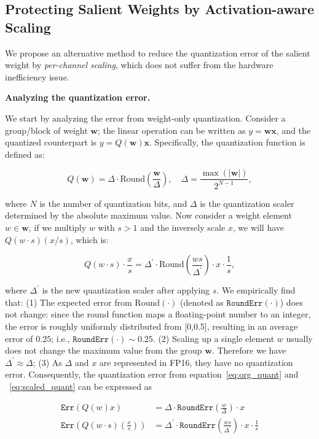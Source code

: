 \subsection{Protecting Salient Weights by Activation-aware Scaling} We propose an alternative method to reduce the quantization error of the salient weight by \emph{per-channel scaling}, which does not suffer from the hardware inefficiency issue. 

\textbf{Analyzing the quantization error.}

We start by analyzing the error from weight-only quantization. Consider a group/block of weight $\mathbf{w}$; the linear operation can be written as $y=\mathbf{w}\mathbf{x}$, and the quantized counterpart is $y=Q(\mathbf{w})\mathbf{x}$. Specifically, the quantization function is defined as:

\begin{equation}
    Q(\mathbf{w}) = \Delta \cdot \text{Round}(\frac{\mathbf{w}}{\Delta}), \quad \Delta = \frac{\max(|\mathbf{w}|)}{2^{N-1}},
    \label{eq:org_quant}
\end{equation}

where $N$ is the number of quantization bits, and $\Delta$ is the quantization scaler determined by the absolute maximum value. Now consider a weight element $w\in \mathbf{w}$, if we multiply $w$ with $s> 1$ and the inversely scale $x$, we will have $Q(w\cdot s)(x/s)$, which is:

\begin{equation}
    Q(w\cdot s)\cdot \frac{x}{s} = \Delta^{'} \cdot \text{Round}(\frac{ws}{\Delta^{'}}) \cdot x \cdot \frac{1}{s},
    \label{eq:scaled_quant}
\end{equation}

where $\Delta^{'}$ is the new quantization scaler after applying $s$. We empirically find that: (1) The expected error from $\text{Round}(\cdot)$ (denoted as $\texttt{RoundErr}(\cdot)$) does not change: since the round function maps a floating-point number to an integer, the error is roughly uniformly distributed from [0,0.5], resulting in an average error of $0.25$; i.e., $\texttt{RoundErr}(\cdot)\sim 0.25$. (2) Scaling up a single element $w$ usually does not change the maximum value from the group $\mathbf{w}$. Therefore we have $\Delta^{'}\approx\Delta$;
(3) As $\Delta$ and $x$ are represented in FP16, they have no quantization error. Consequently, the quantization error from equation~\ref{eq:org_quant} and ~\ref{eq:scaled_quant} can be expressed as

\begin{equation}
\begin{aligned}
\texttt{Err}(Q(w) x) &= \Delta\cdot \texttt{RoundErr}(\frac{w}{\Delta})\cdot x \\
\texttt{Err}(Q(w \cdot s)(\frac{x}{s})) &= \Delta^{'}\cdot \texttt{RoundErr}(\frac{ws}{\Delta^{'}})\cdot x\cdot \frac{1}{s}
\end{aligned}
\end{equation}


